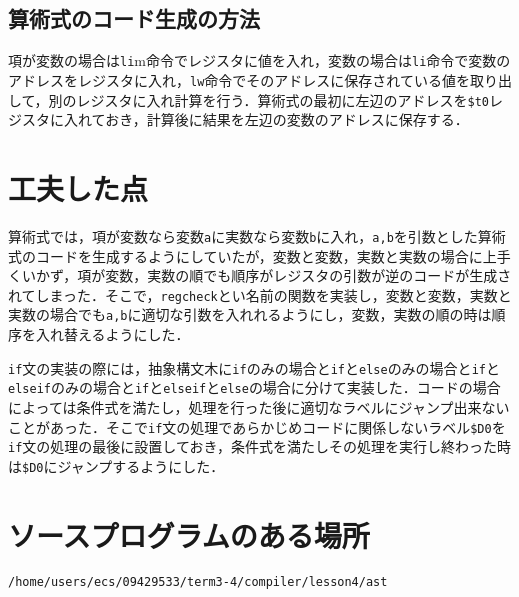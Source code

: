 \documentclass{jarticle}[11pt]
\begin{document}
\subsection{算術式のコード生成の方法}
項が変数の場合は\verb|li|m命令でレジスタに値を入れ，変数の場合は\verb|li|命令で変数のアドレスをレジスタに入れ，\verb|lw|命令でそのアドレスに保存されている値を取り出して，別のレジスタに入れ計算を行う．算術式の最初に左辺のアドレスを\verb|$t0|レジスタに入れておき，計算後に結果を左辺の変数のアドレスに保存する．
\section{工夫した点}
算術式では，項が変数なら変数\verb|a|に実数なら変数\verb|b|に入れ，\verb|a,b|を引数とした算術式のコードを生成するようにしていたが，変数と変数，実数と実数の場合に上手くいかず，項が変数，実数の順でも順序がレジスタの引数が逆のコードが生成されてしまった．そこで，\verb|regcheck|とい名前の関数を実装し，変数と変数，実数と実数の場合でも\verb|a,b|に適切な引数を入れれるようにし，変数，実数の順の時は順序を入れ替えるようにした．

\verb|if|文の実装の際には，抽象構文木に\verb|if|のみの場合と\verb|if|と\verb|else|のみの場合と\verb|if|と\verb|elseif|のみの場合と\verb|if|と\verb|elseif|と\verb|else|の場合に分けて実装した．コードの場合によっては条件式を満たし，処理を行った後に適切なラベルにジャンプ出来ないことがあった．そこで\verb|if|文の処理であらかじめコードに関係しないラベル\verb|$D0|を\verb|if|文の処理の最後に設置しておき，条件式を満たしその処理を実行し終わった時は\verb|$D0|にジャンプするようにした．

\section{ソースプログラムのある場所}
\begin{verbatim}
/home/users/ecs/09429533/term3-4/compiler/lesson4/ast
\end{verbatim}

\end{document}
